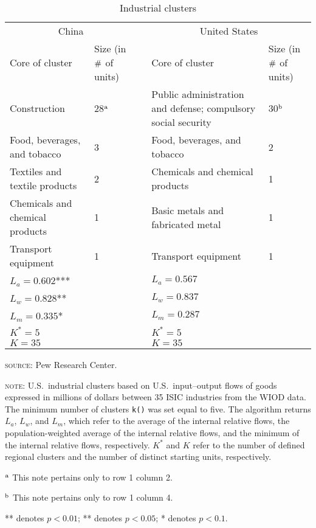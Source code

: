 \begin{table}[h!]
\begin{threeparttable}
\centering
\caption{Industrial clusters}
\label{Table4}
\begin{tabularx}{\textwidth}{X  p{1.5cm}  p{1pt}  X  p{1.5cm}}
\hline
\multicolumn{2}{c}{China} & & \multicolumn{2}{c}{United States} \\
\cline{1-2} \cline{4-5}
Core of cluster & Size (in ${\it \#\/}$ of units) & & Core of cluster & Size (in ${\it \#\/}$ of units) \\
\cline{1-2} \cline{4-5}
Construction & 28$^{\rm a}$ & & Public administration and defense; compulsory social
security & 30$^{\rm b}$ \\
Food, beverages, and tobacco & 3 & & Food, beverages, and tobacco & 2 \\
Textiles and textile products & 2 & & Chemicals and chemical products & 1 \\
Chemicals and chemical products & 1 & & Basic metals and fabricated metal & 1 \\
Transport equipment & 1 & & Transport equipment & 1 \\
\hline
\multicolumn{2}{l}{$L_a=0.602$***} & & \multicolumn{2}{l}{$L_a=0.567$} \\
\multicolumn{2}{l}{$L_w=0.828$**} & & \multicolumn{2}{l}{$L_w=0.837$} \\
\multicolumn{2}{l}{$L_m=0.335$*} & & \multicolumn{2}{l}{$L_m=0.287$} \\
\multicolumn{2}{l}{$K^*=5$} & & \multicolumn{2}{l}{$K^*=5$} \\
\multicolumn{2}{l}{$K=35$} & & \multicolumn{2}{l}{$K=35$} \\
\hline
\end{tabularx}
\begin{tablenotes}
\footnotesize
\item \textsc{source:} Pew Research Center.
\item \textsc{note:} U.S.~industrial clusters based on
U.S.~input--output flows of goods expressed in millions of dollars between 35
{\smrm ISIC} industries from the {\smrm WIOD} data. The minimum number of
clusters \texttt{k()} was set equal to five. The algorithm returns $L_a$,
$L_w$, and $L_m$, which refer to the average of the internal relative
flows, the population-weighted average of the internal relative
flows, and the minimum of the internal relative flows,
respectively. $K^*$ and $K$ refer to the number of defined regional clusters
and the number of distinct starting units, respectively.
\item $^{\rm a}$ This note pertains only to row 1 column 2.
\item $^{\rm b}$ This note pertains only to row 1 column 4.
\item *** denotes $p<0.01$; ** denotes $p<0.05$; * denotes $p<0.1$.
\end{tablenotes}
\end{threeparttable}
\end{table}

